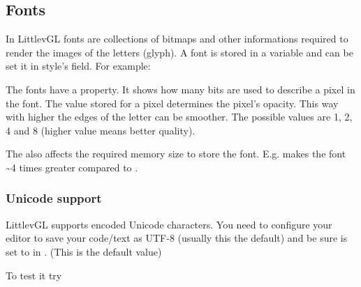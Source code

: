 \documentclass[letterpaper,10pt,english]{sphinxmanual}
\begin{document}
\subsection{Fonts}
\label{\detokenize{overview/fonts:fonts}}\label{\detokenize{overview/fonts::doc}}
In LittlevGL fonts are collections of bitmaps and other informations required to render the images of the letters (glyph). A font is stored in a  variable and can be set it in style’s  field. For example:

\begin{sphinxVerbatim}[commandchars=\\\{\}]
    
\end{sphinxVerbatim}

The fonts have a  property. It shows how many bits are used to describe a pixel in the font. The value stored for a pixel determines the pixel’s opacity.
This way with higher  the edges of the letter can be smoother. The possible  values are 1, 2, 4 and 8 (higher value means better quality).

The  also affects the required memory size to store the font. E.g.  makes the font \textasciitilde{}4 times greater compared to .


\subsubsection{Unicode support}
\label{\detokenize{overview/fonts:unicode-support}}
LittlevGL supports  encoded Unicode characters.
You need to configure your editor to save your code/text as UTF-8 (usually this the default) and be sure  is set to  in . (This is the default value)

To test it try

\begin{sphinxVerbatim}[commandchars=\\\{\}]
     
 
\end{sphinxVerbatim}
\end{document}
